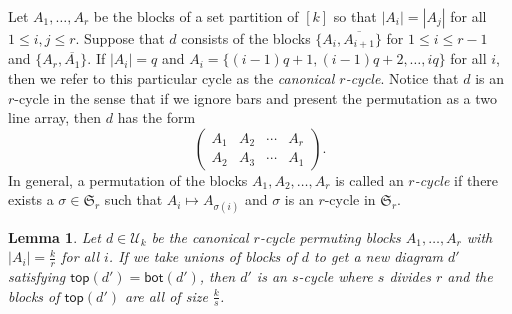 \documentclass[10pt]{amsart}
\newtheorem{lemma}[theorem]{Lemma}
\theoremstyle{definition}
\theoremstyle{remark}
\newcommand{\defncolor}{\color{darkred}}
\newcommand{\defn}[1]{{\defncolor\emph{#1}}} %
\begin{document}
Let $A_1, \ldots, A_r$ be the blocks of a set partition of $[k]$ so that $|A_i| = |A_j|$ for all $1\leqslant i, j\leqslant r$. Suppose that $d$ consists of
the blocks $\{A_i, \overline{A_{i+1}}\}$ for $1\leqslant i \leqslant r-1$ and $\{A_r, \overline{A_1}\}$. If $|A_i|=q$ and $A_i =\{(i-1)q +1, (i-1)q +2,\ldots, iq\}$ 
for all $i$, then we refer to this particular cycle as the \defn{canonical $r$-cycle}.  Notice that $d$ is an $r$-cycle in the sense that if we
ignore bars and present the permutation as a two line array, then $d$ has the form
\[
    \left( \begin{array}{cccc}
    A_1 & A_2 & \cdots & A_r\\
    A_2 & A_3 & \cdots & A_1
    \end{array}\right).
\]
In general, a permutation of the blocks $A_1, A_2, \ldots, A_r$ is called an
\defn{$r$-cycle} if there exists a $\sigma\in \mathfrak{S}_r$ such that $A_i \mapsto A_{\sigma(i)}$ and $\sigma$ is an $r$-cycle in $\mathfrak{S}_r$.

\begin{lemma}
\label{lem:onecycle}
Let $d\in \mathcal{U}_k$ be the canonical $r$-cycle permuting blocks $A_1, \ldots, A_r$ with $|A_i| = \frac{k}{r}$ for all $i$.
If we take unions of blocks of $d$ to get a new diagram $d'$ satisfying $\mathsf{top}(d') = \mathsf{bot}(d')$, then $d'$ is an $s$-cycle where $s$
divides $r$ and the blocks of $\mathsf{top}(d')$ are all of size $\frac{k}{s}$.
\end{lemma}
\end{document}
